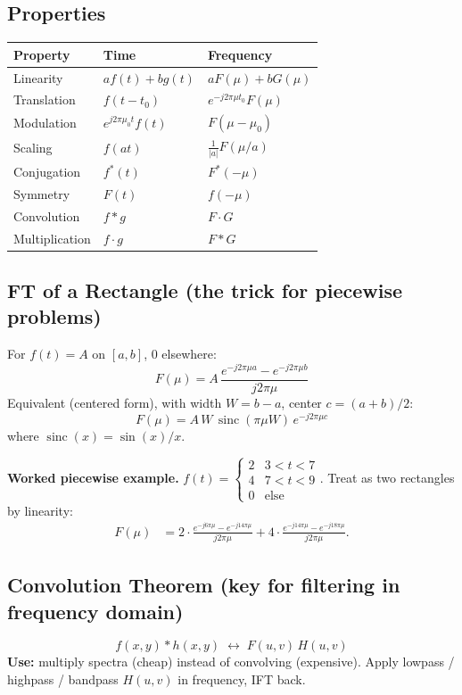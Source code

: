 \documentclass[10pt]{article}
\begin{document}
\subsection{Properties}
\begin{tcolorbox}[studybox]
\begin{tabular}{@{}lll@{}}
\toprule
\textbf{Property} & \textbf{Time} & \textbf{Frequency} \\
\midrule
Linearity & $af(t)+bg(t)$ & $aF(\mu)+bG(\mu)$ \\
Translation & $f(t-t_0)$ & $e^{-j2\pi\mu t_0}F(\mu)$ \\
Modulation & $e^{j2\pi\mu_0 t}f(t)$ & $F(\mu-\mu_0)$ \\
Scaling & $f(at)$ & $\tfrac{1}{|a|}F(\mu/a)$ \\
Conjugation & $f^*(t)$ & $F^*(-\mu)$ \\
Symmetry & $F(t)$ & $f(-\mu)$ \\
Convolution & $f*g$ & $F\cdot G$ \\
Multiplication & $f\cdot g$ & $F * G$ \\
\bottomrule
\end{tabular}
\end{tcolorbox}

\subsection{FT of a Rectangle (the trick for piecewise problems)}
\begin{tcolorbox}[procbox]
For $f(t) = A$ on $[a,b]$, 0 elsewhere:
\[
F(\mu) = A\,\frac{e^{-j2\pi\mu a} - e^{-j2\pi\mu b}}{j2\pi\mu}
\]
Equivalent (centered form), with width $W=b-a$, center $c=(a+b)/2$:
\[
F(\mu) = A\,W\,\operatorname{sinc}(\pi\mu W)\,e^{-j2\pi\mu c}
\]
where $\operatorname{sinc}(x) = \sin(x)/x$.
\end{tcolorbox}

\textbf{Worked piecewise example.}
$f(t) = \begin{cases}2 & 3<t<7 \\ 4 & 7<t<9 \\ 0 & \text{else}\end{cases}$.
Treat as two rectangles by linearity:
\begin{align*}
F(\mu) &= 2 \cdot \frac{e^{-j6\pi\mu}-e^{-j14\pi\mu}}{j2\pi\mu}
+ 4 \cdot \frac{e^{-j14\pi\mu}-e^{-j18\pi\mu}}{j2\pi\mu}.
\end{align*}

\subsection{Convolution Theorem (key for filtering in frequency domain)}
\[
f(x,y) * h(x,y) \;\longleftrightarrow\; F(u,v)\, H(u,v)
\]
\textbf{Use:} multiply spectra (cheap) instead of convolving (expensive). Apply lowpass / highpass / bandpass $H(u,v)$ in frequency, IFT back.
\end{document}

